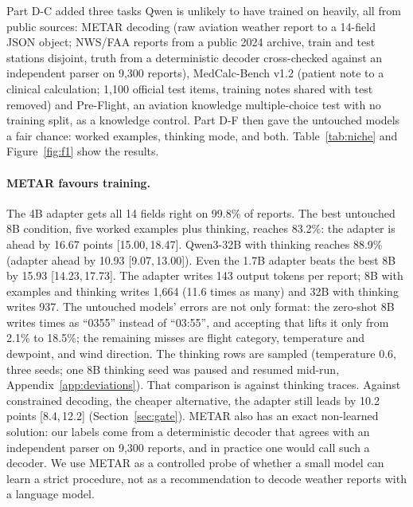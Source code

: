 \documentclass[11pt]{article}
\newcommand{\ci}[2]{[#1,\allowbreak\,#2]}
\begin{document}
Part D-C added three tasks Qwen is unlikely to have trained on heavily, all from public sources: METAR decoding
(raw aviation weather report to a 14-field JSON object; NWS/FAA reports from a public 2024 archive, train and test
stations disjoint, truth from a deterministic decoder cross-checked against an independent parser on 9,300 reports),
MedCalc-Bench v1.2 (patient note to a clinical calculation; 1,100 official test items, training notes shared with
test removed) and Pre-Flight, an aviation knowledge multiple-choice test with no training split, as a knowledge
control. Part D-F then gave the untouched models a fair chance: worked examples, thinking mode, and both.
Table~\ref{tab:niche} and Figure~\ref{fig:f1} show the results.

\paragraph{METAR favours training.} The 4B adapter gets all 14 fields right on 99.8\% of reports. The best untouched
8B condition, five worked examples plus thinking, reaches 83.2\%: the adapter is ahead by 16.67 points
\ci{15.00}{18.47}. Qwen3-32B with thinking reaches 88.9\% (adapter ahead by 10.93 \ci{9.07}{13.00}). Even the 1.7B
adapter beats the best 8B by 15.93 \ci{14.23}{17.73}. The adapter writes 143 output tokens per report; 8B with
examples and thinking writes 1,664 (11.6 times as many) and 32B with thinking writes 937. The untouched models'
errors are not only format: the zero-shot 8B writes times as ``0355'' instead of ``03:55'', and accepting that
lifts it only from 2.1\% to 18.5\%; the remaining misses are flight category, temperature and dewpoint, and wind
direction. The thinking rows are sampled (temperature 0.6, three seeds; one 8B thinking seed was paused and resumed
mid-run, Appendix~\ref{app:deviations}). That comparison is against thinking traces. Against constrained decoding, the cheaper alternative, the
adapter still leads by 10.2 points \ci{8.4}{12.2} (Section~\ref{sec:gate}). METAR also has
an exact non-learned solution: our labels come from a deterministic decoder that agrees with an independent parser on
9,300 reports, and in practice one would call such a decoder. We use METAR as a controlled probe of whether a small
model can learn a strict procedure, not as a recommendation to decode weather reports with a language model.
\end{document}
